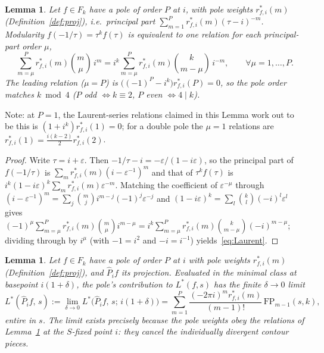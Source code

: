 \documentclass[11pt]{article}
\newtheorem{lemma}[theorem]{Lemma}
\begin{document}
\begin{lemma}\label{lem:Laurent}
Let $f\in F_k$ have a pole of order $P$ at $i$, with pole weights $r^*_{f,i}(m)$
(Definition~\ref{def:proj}), i.e.\ principal part $\sum_{m=1}^{P}r^*_{f,i}(m)(\tau-i)^{-m}$.
Modularity $f(-1/\tau)=\tau^k f(\tau)$ is equivalent to one relation for each principal-part
order $\mu$,
\begin{equation}\label{eq:Laurent}
\sum_{m=\mu}^{P} r^*_{f,i}(m)\binom{m}{\mu}\,i^{m}
=i^{k}\sum_{m=\mu}^{P} r^*_{f,i}(m)\binom{k}{m-\mu}\,i^{-m},\qquad \forall \mu=1,\dots,P.
\end{equation}
The leading relation ($\mu=P$) is $\big((-1)^P-i^k\big)r^*_{f,i}(P)=0$, so the pole order matches
$k\bmod4$ ($P$ odd $\Leftrightarrow k\equiv2$, $P$ even $\Leftrightarrow 4\mid k$).
\end{lemma}

Note: at $P=1$, the Laurent-series relations claimed in this Lemma work out to be this is 
$(1+i^k)r^*_{f,i}(1)=0$; for a double pole the $\mu=1$ relations are $r^*_{f,i}(1)=\tfrac{i(k-2)}{2}r^*_{f,i}(2)$.

\begin{proof}
Write $\tau=i+\varepsilon$. Then $-1/\tau-i=-\varepsilon/(1-i\varepsilon)$, so the principal
part of $f(-1/\tau)$ is $\sum_m r^*_{f,i}(m)(i-\varepsilon^{-1})^m$ and that of $\tau^k f(\tau)$ is
$i^k(1-i\varepsilon)^k\sum_m r^*_{f,i}(m)\varepsilon^{-m}$. Matching the coefficient of
$\varepsilon^{-\mu}$ through
$(i-\varepsilon^{-1})^m=\sum_j\binom mj i^{m-j}(-1)^j\varepsilon^{-j}$ and
$(1-i\varepsilon)^k=\sum_l\binom kl(-i)^l\varepsilon^l$ gives
$(-1)^\mu\sum_{m=\mu}^P r^*_{f,i}(m)\binom{m}{\mu}i^{m-\mu}=i^k\sum_{m=\mu}^P r^*_{f,i}(m)\binom{k}{m-\mu}(-i)^{m-\mu}$;
dividing through by $i^\mu$ (with $-1=i^2$ and $-i=i^{-1}$) yields~\eqref{eq:Laurent}.
\end{proof}


\begin{lemma}\label{lem:wallvalue}
Let $f\in F_k$ have a pole of order $P$ at $i$ with pole weights $r^*_{f,i}(m)$
(Definition~\ref{def:proj}), and $\widehat P_i f$ its projection. Evaluated in the minimal class at
basepoint $i(1+\delta)$, the pole's contribution to $L^*(f,s)$ has the finite $\delta\to0$ limit
\begin{equation}\label{eq:wallvalue}
L^*(\widehat P_i f,\,s):=\lim_{\delta\to0}L^*\big(\widehat P_i f,\,s;\,i(1+\delta)\big)
=\sum_{m=1}^P \frac{(-2\pi i)^m r^*_{f,i}(m)}{(m-1)!}\,\mathrm{FP}_{m-1}(s,k),
\end{equation}
entire in $s$. The limit exists precisely because the pole weights obey the relations of
Lemma~\ref{lem:Laurent} at the $S$-fixed point $i$: they cancel the individually divergent
contour pieces.
\end{lemma}
\end{document}
